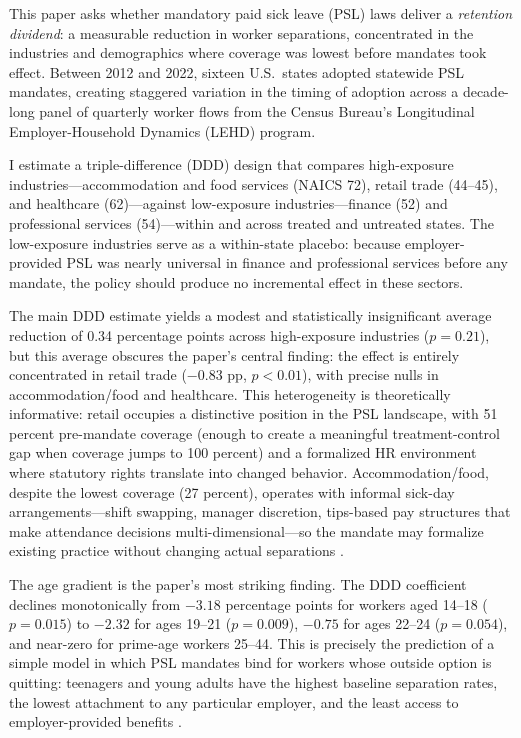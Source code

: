\documentclass[12pt]{article}
\begin{document}
This paper asks whether mandatory paid sick leave (PSL) laws deliver a \textit{retention dividend}: a measurable reduction in worker separations, concentrated in the industries and demographics where coverage was lowest before mandates took effect. Between 2012 and 2022, sixteen U.S.\ states adopted statewide PSL mandates, creating staggered variation in the timing of adoption across a decade-long panel of quarterly worker flows from the Census Bureau's Longitudinal Employer-Household Dynamics (LEHD) program.

I estimate a triple-difference (DDD) design that compares high-exposure industries---accommodation and food services (NAICS 72), retail trade (44--45), and healthcare (62)---against low-exposure industries---finance (52) and professional services (54)---within and across treated and untreated states. The low-exposure industries serve as a within-state placebo: because employer-provided PSL was nearly universal in finance and professional services before any mandate, the policy should produce no incremental effect in these sectors.

The main DDD estimate yields a modest and statistically insignificant average reduction of 0.34 percentage points across high-exposure industries ($p = 0.21$), but this average obscures the paper's central finding: the effect is entirely concentrated in retail trade ($-0.83$ pp, $p < 0.01$), with precise nulls in accommodation/food and healthcare. This heterogeneity is theoretically informative: retail occupies a distinctive position in the PSL landscape, with 51 percent pre-mandate coverage (enough to create a meaningful treatment-control gap when coverage jumps to 100 percent) and a formalized HR environment where statutory rights translate into changed behavior. Accommodation/food, despite the lowest coverage (27 percent), operates with informal sick-day arrangements---shift swapping, manager discretion, tips-based pay structures that make attendance decisions multi-dimensional---so the mandate may formalize existing practice without changing actual separations \citep{appelbaum2014, lambert2012}.

The age gradient is the paper's most striking finding. The DDD coefficient declines monotonically from $-3.18$ percentage points for workers aged 14--18 ($p = 0.015$) to $-2.32$ for ages 19--21 ($p = 0.009$), $-0.75$ for ages 22--24 ($p = 0.054$), and near-zero for prime-age workers 25--44. This is precisely the prediction of a simple model in which PSL mandates bind for workers whose outside option is quitting: teenagers and young adults have the highest baseline separation rates, the lowest attachment to any particular employer, and the least access to employer-provided benefits \citep{dube2019}.
\end{document}
